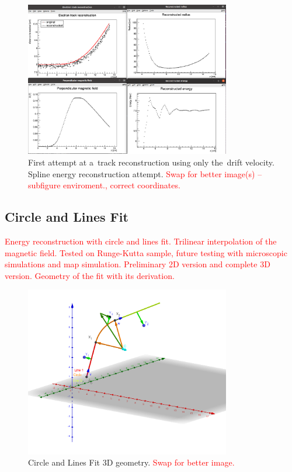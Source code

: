 \documentclass[]{article}
\begin{document}
	\begin{figure}
		\centering
		\includegraphics[width=0.8\textwidth]{9010_splines.png}
		\caption{First attempt at a~track reconstruction using only the~drift velocity. Spline energy reconstruction attempt. \textcolor{red}{Swap for better image(s) -- subfigure enviroment., correct coordinates.}}
		\label{fig:9010splines}
	\end{figure}
	
	\subsection{Circle and Lines Fit}
	\textcolor{red}{Energy reconstruction with circle and lines fit. Trilinear interpolation of the magnetic field. Tested on Runge-Kutta sample, future testing with microscopic simulations and map simulation. Preliminary 2D version and complete 3D version. Geometry of the fit with its derivation.}
	
	\begin{figure}
		\centering
		\includegraphics[width=0.8\textwidth]{circlefit.png}
		\caption{Circle and Lines Fit 3D geometry. \textcolor{red}{Swap for better image.}}
		\label{fig:circlefit}
	\end{figure}
	
\end{document}
